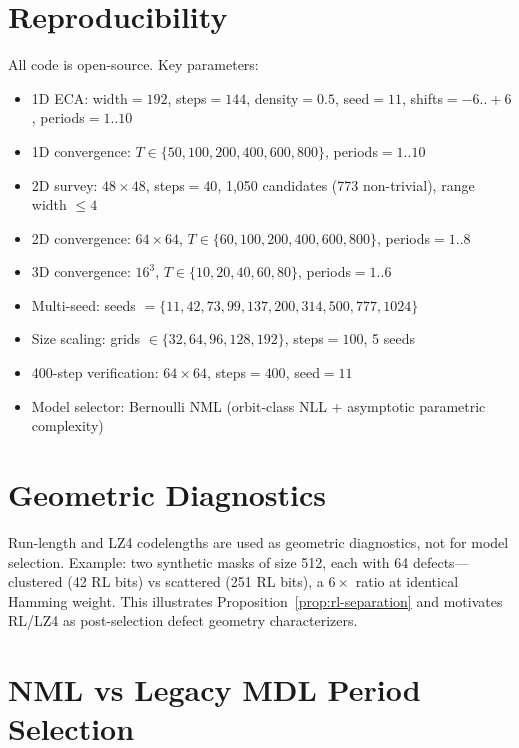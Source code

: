 \documentclass[11pt]{article}
\theoremstyle{definition}
\theoremstyle{remark}
\begin{document}
\appendix

\section{Reproducibility}\label{app:repro}

All code is open-source. Key parameters:
\begin{itemize}
    \item 1D ECA: width${}=192$, steps${}=144$, density${}=0.5$, seed${}=11$, shifts${}=-6..{+}6$, periods${}=1..10$
    \item 1D convergence: $T \in \{50, 100, 200, 400, 600, 800\}$, periods${}=1..10$
    \item 2D survey: $48 \times 48$, steps${}=40$, 1{,}050 candidates (773 non-trivial), range width $\leq 4$
    \item 2D convergence: $64 \times 64$, $T \in \{60, 100, 200, 400, 600, 800\}$, periods${}=1..8$
    \item 3D convergence: $16^3$, $T \in \{10, 20, 40, 60, 80\}$, periods${}=1..6$
    \item Multi-seed: seeds $= \{11, 42, 73, 99, 137, 200, 314, 500, 777, 1024\}$
    \item Size scaling: grids $\in \{32, 64, 96, 128, 192\}$, steps${}=100$, 5 seeds
    \item 400-step verification: $64 \times 64$, steps${}=400$, seed${}=11$
    \item Model selector: Bernoulli NML (orbit-class NLL + asymptotic parametric complexity)
\end{itemize}

\section{Geometric Diagnostics}\label{app:geom}

Run-length and LZ4 codelengths are used as geometric diagnostics, not for model selection.
Example: two synthetic masks of size 512, each with 64 defects---clustered (42 RL bits) vs scattered (251 RL bits), a $6\times$ ratio at identical Hamming weight.
This illustrates Proposition~\ref{prop:rl-separation} and motivates RL/LZ4 as post-selection defect geometry characterizers.

\section{NML vs Legacy MDL Period Selection}\label{app:nml-mdl}
\end{document}
